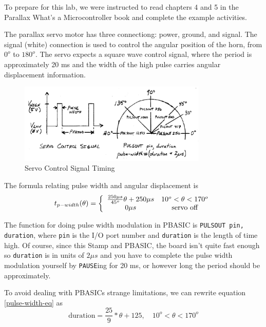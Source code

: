 \documentclass[11pt]{article}
\begin{document}
To prepare for this lab, we were instructed to read chapters 4 and 5 in the Parallax What's a Microcontroller book and complete the example activities.

The parallax servo motor has three connectiong: power, ground, and signal.
The signal (white) connection is used to control the angular position of
the horn, from $0^{o}$ to $180^{o}$.
The servo expects a square wave control signal,
where the period is approximately 20 ms
and the width of the high pulse carries angular displacement information.

\begin{figure}[h!]
\centering
\includegraphics[width=0.8\textwidth]{pulse-width-vs-angular-displacement.pdf}
\caption{Servo Control Signal Timing}
\label{pulse-width-vs-angular-displacement}
\end{figure}

The formula relating pulse width and angular displacement is
\begin{equation}
t_{p-width}(\theta)=\left\{\begin{array}{c c}
\frac{250\mu s}{45^{o}}\theta+250\mu s	&	10^{o}<\theta<170^{o}\\
0\mu s	&	\textrm{servo off}	\\
\end{array}\right.
\label{pulse-width-eq}
\end{equation}

The function for doing pulse width modulation in PBASIC is
\texttt{PULSOUT pin, duration}, where \texttt{pin} is the
I/O port number and \texttt{duration} is the length of time high.
Of course, since this Stamp and PBASIC, the board isn't quite
fast enough so \texttt{duration} is in units of $2\mu s$ and
you have to complete the pulse width modulation yourself by
\texttt{PAUSE}ing for 20 ms, or however long the period should
be approximately.

To avoid dealing with PBASICs strange limitations,
we can rewrite equation \ref{pulse-width-eq} as
\begin{equation}
\textrm{duration}=\frac{25}{9}*\theta+125, \quad 10^{o}<\theta<170^{o}
\end{equation}
\end{document}
